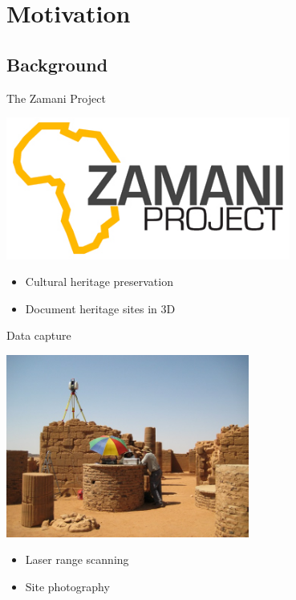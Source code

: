 \documentclass[compress]{beamer}
\begin{document}
\section{Motivation}

\subsection{Background}

\begin{frame}{The Zamani Project}

  \includegraphics[width=0.70\textwidth]{pics/Zamani_logo}

  \begin{itemize}
  \item Cultural heritage preservation
  \item Document heritage sites in 3D 
  \end{itemize}
\end{frame}

\begin{frame}{Data capture}

  \includegraphics[width=0.60\textwidth]{pics/scanning.jpg}
    \begin{itemize}
  \item
    Laser range scanning
  \item
    Site photography
  \end{itemize}
\end{frame}
\end{document}
